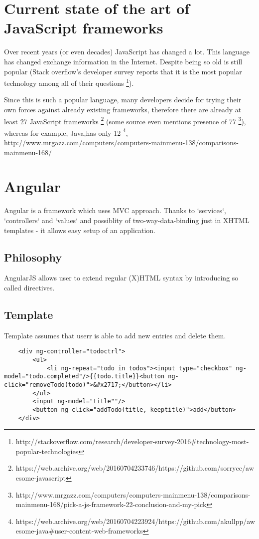 \documentclass[inzynier,druk,ramka]{build/dyplom}
\begin{document}
\chapter{Current state of the art of JavaScript frameworks}

Over recent years (or even  decades) JavaScript has changed a lot. This language has changed exchange information in the Internet. Despite being so old is still popular (Stack overflow's developer survey reports that it is the most popular technology among all of their questions \footnote{http://stackoverflow.com/research/developer-survey-2016#technology-most-popular-technologies}).

Since this is such a popular language, many developers decide for trying their own forces against already existing frameworks, therefore there are already at least 27 JavaScript frameworks \footnote{https://web.archive.org/web/20160704233746/https://github.com/sorrycc/awesome-javascript} (some source even mentions presence of 77 \footnote{http://www.mrgazz.com/computers/computers-mainmenu-138/comparisons-mainmenu-168/pick-a-js-framework-22-conclusion-and-my-pick}), whereas for example, Java,has only 12 \footnote{https://web.archive.org/web/20160704223924/https://github.com/akullpp/awesome-java#user-content-web-frameworks},
http://www.mrgazz.com/computers/computers-mainmenu-138/comparisons-mainmenu-168/

\chapter{Angular}

Angular is a framework which uses MVC approach. Thanks to `services`, `controllers` and `values` and possiblity of two-way-data-binding just in XHTML templates - it allows easy setup of an application.

\section{Philosophy}

AngularJS allows user to extend regular (X)HTML syntax by introducing so called directives.

\section{Template}

Template assumes that userr is able to add new entries and delete them.

\begin{lstlisting}
    <div ng-controller="todoctrl">
        <ul>
            <li ng-repeat="todo in todos"><input type="checkbox" ng-model="todo.completed"/>{{todo.title}}<button ng-click="removeTodo(todo)">&#x2717;</button></li>
        </ul>
        <input ng-model="title""/>
        <button ng-click="addTodo(title, keeptitle)">add</button>
    </div>
\end{lstlisting}
\end{document}

